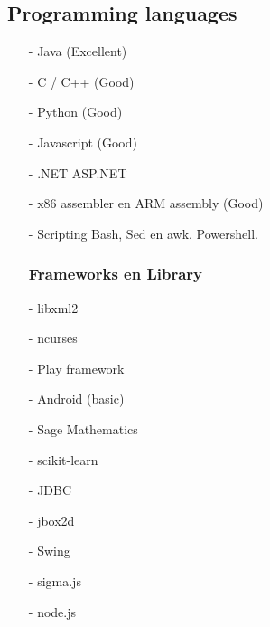 \documentclass[margin, 10pt]{res} %
\begin{document}
\subsection{Programming languages}
\begin{multicols}{2}
\begin{enumerate}
\item[-] Java (Excellent)
\item[-] C / C++ (Good)
\item[-] Python (Good)
\item[-] Javascript (Good)

\item[-] .NET
\subitem ASP.NET
\item[-] x86 assembler en ARM assembly (Good)
\item[-] Scripting
\subitem Bash, Sed en awk.
\subitem Powershell.
\subsubsection*{Frameworks en Library}
\item[-] libxml2
\item[-] ncurses
\item[-] Play framework
\item[-] Android (basic)
\item[-] Sage Mathematics
\item[-] scikit-learn
\item[-] JDBC
\item[-] jbox2d
\item[-] Swing
\item[-] sigma.js
\item[-] node.js
\end{enumerate}
\end{multicols}
\end{document}
